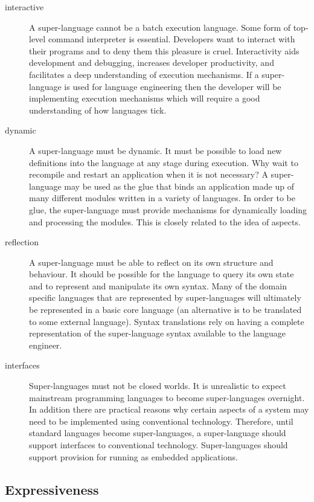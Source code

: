 \begin{description}
\item [{interactive}] A super-language cannot be a batch execution language.
Some form of top-level command interpreter is essential. Developers
want to interact with their programs and to deny them this pleasure
is cruel. Interactivity aids development and debugging, increases
developer productivity, and facilitates a deep understanding of execution
mechanisms. If a super-language is used for language engineering then
the developer will be implementing execution mechanisms which will
require a good understanding of how languages tick.
\item [{dynamic}] A super-language must be dynamic. It must be possible
to load new definitions into the language at any stage during execution.
Why wait to recompile and restart an application when it is not necessary?
A super-language may be used as the glue that binds an application
made up of many different modules written in a variety of languages.
In order to be glue, the super-language must provide mechanisms for
dynamically loading and processing the modules. This is closely related
to the idea of aspects.
\item [{reflection}] A super-language must be able to reflect on its own
structure and behaviour. It should be possible for the language to
query its own state and to represent and manipulate its own syntax.
Many of the domain specific languages that are represented by super-languages
will ultimately be represented in a basic core language (an alternative
is to be translated to some external language). Syntax translations
rely on having a complete representation of the super-language syntax
available to the language engineer.
\item [{interfaces}] Super-languages must not be closed worlds. It is unrealistic
to expect mainstream programming languages to become super-languages
overnight. In addition there are practical reasons why certain aspects
of a system may need to be implemented using conventional technology.
Therefore, until standard languages become super-languages, a super-language
should support interfaces to conventional technology. Super-languages
should support provision for running as embedded applications.
\end{description}

\subsection{Expressiveness}


